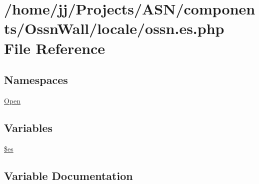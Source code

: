 \hypertarget{components_2_ossn_wall_2locale_2ossn_8es_8php}{}\section{/home/jj/\+Projects/\+A\+S\+N/components/\+Ossn\+Wall/locale/ossn.es.\+php File Reference}
\label{components_2_ossn_wall_2locale_2ossn_8es_8php}
\subsection*{Namespaces}
\begin{DoxyCompactItemize}
\item 
 \hyperlink{namespace_open}{Open}
\end{DoxyCompactItemize}
\subsection*{Variables}
\begin{DoxyCompactItemize}
\item 
\hyperlink{components_2_ossn_wall_2locale_2ossn_8es_8php_a388cbda27103d2baee3997798d1f2744}{\$es}
\end{DoxyCompactItemize}


\subsection{Variable Documentation}
